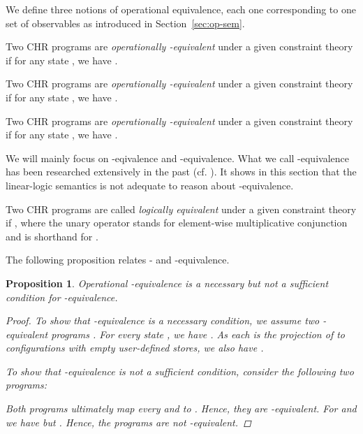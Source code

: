 \documentclass[acmtocl]{acmtrans2m}
\newtheorem{proposition}[theorem]{Proposition}
\begin{document}
We define three notions of operational equivalence, each one corresponding to
one set of observables as introduced in Section~\ref{sec:op-sem}.

\begin{definition}
\begin{longenum}
  \item Two CHR programs  are \emph{operationally
  -equivalent} under a given constraint theory  if for any state , we have
  .
  \item Two CHR programs  are \emph{operationally
  -equivalent} under a given constraint theory  if for
  any state , we have .
  \item Two CHR programs  are \emph{operationally
  -equivalent} under a given constraint theory  if for any state , we have
  .
\end{longenum}
\end{definition}

We will mainly focus on -eqivalence and -equivalence.
What we call -equivalence has been researched extensively in the past
(cf. ). It shows in this
section that the linear-logic semantics is not adequate to reason about
-equivalence.

\begin{definition} Two CHR programs
 are called \emph{logically equivalent} under a given constraint
theory  if , where the unary
operator  stands for element-wise multiplicative conjunction and
 is shorthand for
.
\end{definition}

The following proposition relates - and -equivalence.

\begin{proposition}\label{prop:op-equiv-hierarchy}
Operational -equivalence is a necessary but not a
sufficient condition for -equivalence.
\begin{proof}
To show that -equivalence is a necessary condition, we assume two
-equivalent programs . For every state , we have
. As each  is the projection of
 to configurations with empty user-defined stores, we also have
.

To show that -equivalence is not a sufficient condition, consider the
following two programs:

Both programs ultimately map every  and  to . Hence, they
are -equivalent. For  and
 we have  but
. Hence, the programs are not -equivalent.
\end{proof}
\end{proposition}
\end{document}
